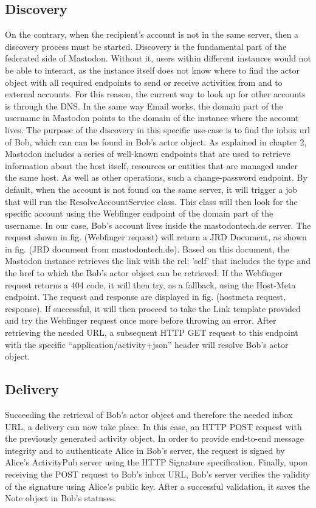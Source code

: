 \subsection*{Discovery}
On the contrary, when the recipient’s account is not in the same server, then a discovery process must be started. Discovery is the fundamental part of the federated side of Mastodon. Without it, users within different instances would not be able to interact, as the instance itself does not know where to find the actor object with all required endpoints to send or receive activities from and to external accounts. For this reason, the current way to look up for other accounts is through the DNS. In the same way Email works, the domain part of the username in Mastodon points to the domain of the instance where the account lives. The purpose of the discovery in this specific use-case is to find the inbox url of Bob, which can can be found in Bob’s actor object. As explained in chapter 2, Mastodon includes a series of well-known endpoints that are used to retrieve information about the host itself, resources or entities that are managed under the same host. As well as other operations, such a change-password endpoint.  By default, when the account is not found on the same server, it will trigger a job that will run the ResolveAccountService class. This class will then look for the specific account using the Webfinger endpoint of the domain part of the username. In our case, Bob’s account lives inside the mastodontech.de server. The request shown in fig. (Webfinger request) will return a JRD Document, as shown in fig. (JRD document from mastodontech.de). Based on this document, the Mastodon instance retrieves the link with the rel: 'self' that includes the type and the href to which the Bob’s actor object can be retrieved. If the Webfinger request returns a 404 code, it will then try, as a fallback, using the Host-Meta endpoint. The request and response are displayed in fig. (hostmeta request, response). If successful, it will then proceed to take the Link template provided and try the Webfinger request once more before throwing an error. After retrieving the needed URL, a subsequent HTTP GET request to this endpoint with the specific “application/activity+json” header will resolve Bob's actor object. 

\subsection*{Delivery}
Succeeding the retrieval of Bob’s actor object and therefore the needed inbox URL, a delivery can now take place. In this case, an HTTP POST request with the previously generated activity object. In order to provide end-to-end message integrity and to authenticate Alice in Bob’s server, the request is signed by Alice’s ActivityPub server using the HTTP Signature specification.
Finally, upon receiving the POST request to Bob’s inbox URL, Bob’s server verifies the validity of the signature using Alice’s public key. After a successful validation, it saves the Note object in Bob’s statuses. 

